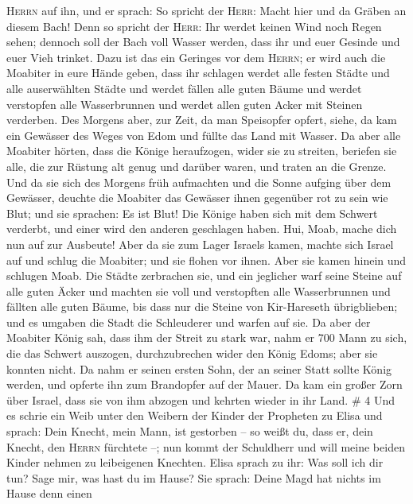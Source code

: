 \textsc{Herrn} auf ihn,  und er sprach: So spricht der
\textsc{Herr}: Macht hier und da Gräben an diesem Bach! 
Denn so spricht der \textsc{Herr}: Ihr werdet keinen Wind noch Regen
sehen; dennoch soll der Bach voll Wasser werden, dass ihr und euer
Gesinde und euer Vieh trinket.  Dazu ist das ein Geringes
vor dem \textsc{Herrn}; er wird auch die Moabiter in eure Hände geben,
 dass ihr schlagen werdet alle festen Städte und alle
auserwählten Städte und werdet fällen alle guten Bäume und werdet
verstopfen alle Wasserbrunnen und werdet allen guten Acker mit Steinen
verderben.  Des Morgens aber, zur Zeit, da man Speisopfer
opfert, siehe, da kam ein Gewässer des Weges von Edom und füllte das
Land mit Wasser.  Da aber alle Moabiter hörten, dass die
Könige heraufzogen, wider sie zu streiten, beriefen sie alle, die zur
Rüstung alt genug und darüber waren, und traten an die Grenze.
 Und da sie sich des Morgens früh aufmachten und die
Sonne aufging über dem Gewässer, deuchte die Moabiter das Gewässer ihnen
gegenüber rot zu sein wie Blut;  und sie sprachen: Es ist
Blut! Die Könige haben sich mit dem Schwert verderbt, und einer wird den
anderen geschlagen haben. Hui, Moab, mache dich nun auf zur Ausbeute!
 Aber da sie zum Lager Israels kamen, machte sich Israel
auf und schlug die Moabiter; und sie flohen vor ihnen. Aber sie kamen
hinein und schlugen Moab.  Die Städte zerbrachen sie, und
ein jeglicher warf seine Steine auf alle guten Äcker und machten sie
voll und verstopften alle Wasserbrunnen und fällten alle guten Bäume,
bis dass nur die Steine von Kir-Hareseth übrigblieben; und es umgaben
die Stadt die Schleuderer und warfen auf sie.  Da aber
der Moabiter König sah, dass ihm der Streit zu stark war, nahm er 700
Mann zu sich, die das Schwert auszogen, durchzubrechen wider den König
Edoms; aber sie konnten nicht.  Da nahm er seinen ersten
Sohn, der an seiner Statt sollte König werden, und opferte ihn zum
Brandopfer auf der Mauer. Da kam ein großer Zorn über Israel, dass sie
von ihm abzogen und kehrten wieder in ihr Land. \# 4  Und
es schrie ein Weib unter den Weibern der Kinder der Propheten zu Elisa
und sprach: Dein Knecht, mein Mann, ist gestorben -- so weißt du, dass
er, dein Knecht, den \textsc{Herrn} fürchtete --; nun kommt der
Schuldherr und will meine beiden Kinder nehmen zu leibeigenen Knechten.
 Elisa sprach zu ihr: Was soll ich dir tun? Sage mir, was
hast du im Hause? Sie sprach: Deine Magd hat nichts im Hause denn einen
